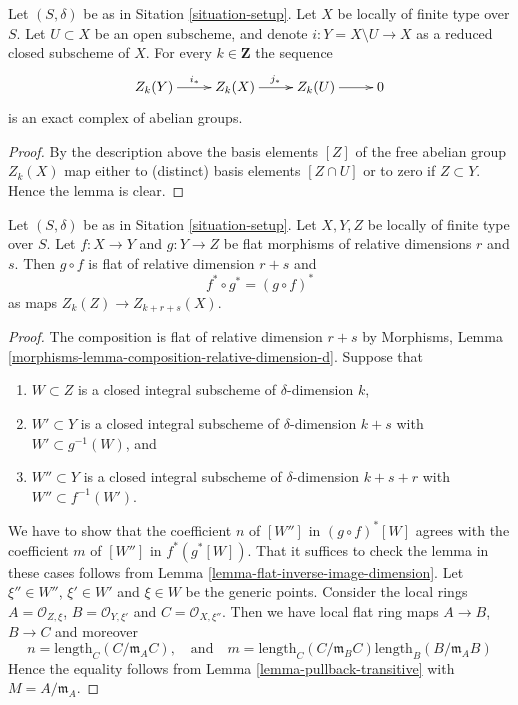 \begin{lemma}
\label{lemma-exact-sequence-open}
Let $(S, \delta)$ be as in Sitation \ref{situation-setup}.
Let $X$ be locally of finite type over $S$.
Let $U \subset X$ be an open subscheme, and denote
$i : Y = X \setminus U \to X$ as a reduced closed subscheme of $X$.
For every $k \in \mathbf{Z}$ the sequence
$$
\xymatrix{
Z_k(Y) \ar[r]^{i_*} & Z_k(X) \ar[r]^{j_*} & Z_k(U) \ar[r] & 0
}
$$
is an exact complex of abelian groups.
\end{lemma}

\begin{proof}
By the description above the basis elements $[Z]$ of the free
abelian group $Z_k(X)$ map either to (distinct) basis elements
$[Z \cap U]$ or to zero if $Z \subset Y$. Hence the lemma is clear.
\end{proof}

\begin{lemma}
\label{lemma-compose-flat-pullback}
Let $(S, \delta)$ be as in Sitation \ref{situation-setup}.
Let $X, Y, Z$ be locally of finite type over $S$.
Let $f : X \to Y$ and $g : Y \to Z$ be flat morphisms of relative dimensions
$r$ and $s$. Then $g \circ f$ is flat of relative dimension
$r + s$ and
$$
f^* \circ g^* = (g \circ f)^*
$$
as maps $Z_k(Z) \to Z_{k + r + s}(X)$.
\end{lemma}

\begin{proof}
The composition is flat of relative dimension $r + s$ by
Morphisms, Lemma \ref{morphisms-lemma-composition-relative-dimension-d}.
Suppose that
\begin{enumerate}
\item $W \subset Z$ is a closed integral subscheme of $\delta$-dimension $k$,
\item $W' \subset Y$ is a closed integral subscheme of $\delta$-dimension
$k + s$ with $W' \subset g^{-1}(W)$, and
\item $W'' \subset Y$ is a closed integral subscheme of $\delta$-dimension
$k + s + r$ with $W'' \subset f^{-1}(W')$.
\end{enumerate}
We have to show that the coefficient $n$ of $[W'']$ in
$(g \circ f)^*[W]$ agrees with the coefficient $m$ of
$[W'']$ in $f^*(g^*[W])$. That it suffices to check the lemma in these
cases follows from Lemma \ref{lemma-flat-inverse-image-dimension}.
Let $\xi'' \in W''$, $\xi' \in W'$
and $\xi \in W$ be the generic points. Consider the local rings
$A = \mathcal{O}_{Z, \xi}$, $B = \mathcal{O}_{Y, \xi'}$
and $C = \mathcal{O}_{X, \xi''}$. Then we have local flat ring maps
$A \to B$, $B \to C$ and moreover
$$
n = \text{length}_C(C/\mathfrak m_AC),
\quad
\text{and}
\quad
m = \text{length}_C(C/\mathfrak m_BC) \text{length}_B(B/\mathfrak m_AB)
$$
Hence the equality follows from Lemma \ref{lemma-pullback-transitive}
with $M = A/\mathfrak m_A$.
\end{proof}

